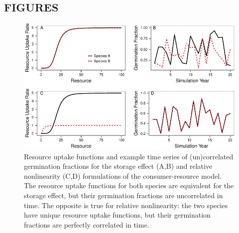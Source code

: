 \documentclass[12pt,]{article}
\begin{document}
\newpage{}

\subsection{FIGURES}\label{figures}

\begin{figure}[htbp]
\centering
\includegraphics{components/figure/manuscript-model_types-1.pdf}
\caption{Resource uptake functions and example time series of
(un)correlated germination fractions for the storage effect (A,B) and
relative nonlinearity (C,D) formulations of the consumer-resource model.
The resource uptake functions for both species are equivalent for the
storage effect, but their germination fractions are uncorrelated in
time. The opposite is true for relative nonlinearity: the two species
have unique resource uptake functions, but their germination fractions
are perfectly correlated in time.}
\end{figure}

\newpage{}
\end{document}

